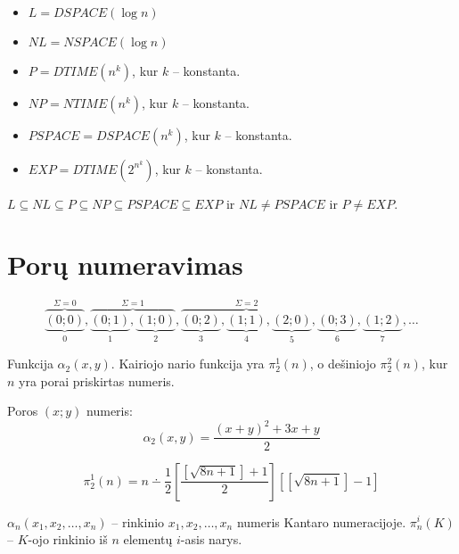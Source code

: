 \begin{defn}
  \hfill \\
  \begin{itemize}
    \item $L = DSPACE(\log n)$
    \item $NL = NSPACE(\log n)$
    \item $P = DTIME(n^k)$, kur $k$ – konstanta.
    \item $NP = NTIME(n^k)$, kur $k$ – konstanta.
    \item $PSPACE = DSPACE(n^k)$, kur $k$ – konstanta.
    \item $EXP = DTIME(2^{n^{k}})$, kur $k$ – konstanta.
  \end{itemize}
\end{defn}

\begin{prop}
  $L \subseteq NL \subseteq P \subseteq NP %
    \subseteq PSPACE \subseteq EXP$
  ir $NL \not = PSPACE$ ir $P \not = EXP$.
\end{prop}

\section{Porų numeravimas}

\[
\overbrace{\underbrace{(0;0)}_{0}}^{\Sigma = 0},%
\overbrace{\underbrace{(0;1)}_{1},\underbrace{(1;0)}_{2}}^{\Sigma = 1},%
\overbrace{\underbrace{(0;2)}_{3},\underbrace{(1;1)}_{4},
  \underbrace{(2;0)}_{5}}^{\Sigma = 2},
  \underbrace{(0;3)}_{6},\underbrace{(1;2)}_{7},\dotsc
\]

\begin{defn}
  Funkcija $\alpha _{2}(x, y)$. Kairiojo nario funkcija yra 
  $\pi_{2}^{1}(n)$, o dešiniojo $\pi_{2}^{2}(n)$, kur $n$ yra porai 
  priskirtas numeris.
\end{defn}

\begin{prop}
  Poros $(x; y)$ numeris:
  \[
  \alpha _{2} (x, y) = \frac{(x+y)^{2} + 3x + y}{2}
  \]
  \begin{note}
    \[
    \pi^{1}_{2} (n) = n \dotminus \frac{1}{2}%
    \left[\frac{[\sqrt{8n + 1}]+1}{2}\right]%
    \left[ [\sqrt{8n + 1}] - 1 \right]
    \]
  \end{note}
\end{prop}

\begin{defn}
  $\alpha_{n}(x_1,x_2,\dotsc,x_n)$ – rinkinio $x_1,x_2,\dotsc,x_n$ numeris
  Kantaro numeracijoje.
  $\pi^{i}_{n} (K)$ – $K$-ojo rinkinio iš $n$ elementų $i$-asis narys.
\end{defn}

